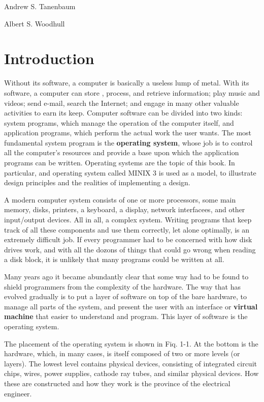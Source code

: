 \documentclass{book}
\newcommand {\kw} [1] {\textbf{#1}}
\begin{document}
Andrew S. Tanenbaum

Albert S. Woodhull


\chapter{Introduction}
Without its software, a computer is basically a useless lump of metal.
With its software, a computer can store , process, and retrieve information; 
play music and videos; send e-mail, search the Internet; and engage in many other valuable activities to earn its keep.
Computer software can be divided into two kinds: system programs, which manage the operation of the computer itself, 
and application programs, which perform the actual work the user wants.
The most fundamental system program is the \kw{operating system}, whose job is to control all the computer's resources and 
provide a base upon which the application programs can be written.
Operating systems are the topic of this book.
In particular, and operating system called MINIX 3 is used as a model, to illustrate design principles and the realities of implementing a design.

A modern computer system consists of one or more processors, some main memory, disks, 
printers, a keyboard, a display, network interfacees, and other input/output devices. 
All in all, a complex system.
Writing programs that keep track of all these components and use them correctly, let alone optimally, is an extremely difficult job.
If every programmer had to be concerned with how disk drives work, and with all the dozons of things that could go wrong when reading a disk block, 
it is unlikely that many programs could be written at all.

Many years ago it became abundantly clear that some way had to be found to shield programmers from the complexity of the hardware.
The way that has evolved gradually is to put a layer of software on top of the bare hardware, 
to manage all parts of the system, and present the user with an interface or \kw{virtual machine} that easier to understand and program.
This layer of software is the operating system.

The placement of the operating system is shown in Fiq. 1-1.
At the bottom is the hardware, which, in many cases, is itself composed of two or more levels (or layers).
The lowest level contains physical devices, consisting of integrated circuit chips, wires, power supplies, cathode ray tubes, and similar physical devices.
How these are constructed and how they work is the province of the electrical engineer.
\end{document}
